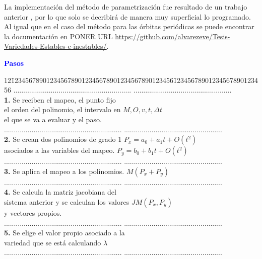 La implementaci\'on del m\'etodo de parametrizaci\'on fue resultado de un trabajo anterior \cite{eve}, por lo que solo se decribir\'a de manera muy superficial lo programado. Al igual que en el caso del m\'etodo para las \'orbitas peri\'odicas se puede encontrar la documentaci\'on en PONER URL \url{https://github.com/alvarezeve/Tesis-Variedades-Estables-e-inestables/}. 

\begin{center}
	\textcolor{blue}{\textbf{Pasos}}
	\begin{tabbing}
		12\=1234567890123456789012345678901234567890123456\=12345678901234567890123456\kill%
		\>............................................................  \>..................................................\\
		\>\textbf{1.} Se reciben el mapeo, el punto fijo  \> \\
		\> el orden del polinomio, el intervalo en  \> $M, O, v, t, \Delta t$\\
		\> el que se va a evaluar y el paso.\> \\
		\>............................................................  \>..................................................\\
		\>\textbf{2.} Se crean dos polinomios de grado 1  \> $P_{x} = a_{0}+a_{1}t+O(t^{2})$\\
		\> asociados a las variables del mapeo. \>  $P_{y} = b_{0} +b_{1}t+O(t^{2})$ \\
		\>............................................................  \>..................................................\\
		\>\textbf{3.} Se aplica el mapeo a los polinomios.  \> $M(P_{x}+P_{y})$\\
		\>............................................................  \>..................................................\\
		\>\textbf{4.} Se calcula la matriz jacobiana del  \> \\
		\>sistema anterior y se calculan los valores \> $JM(P_{x},P_{y})$\\
		\> y vectores propios.\\
		\>............................................................  \>..................................................\\
		\>\textbf{5.} Se elige el valor propio asociado a la  \> \\
		\>variedad que se está calculando \> $\lambda$\\
		\>............................................................  \>..................................................\\

\end{tabbing}
\end{center}
